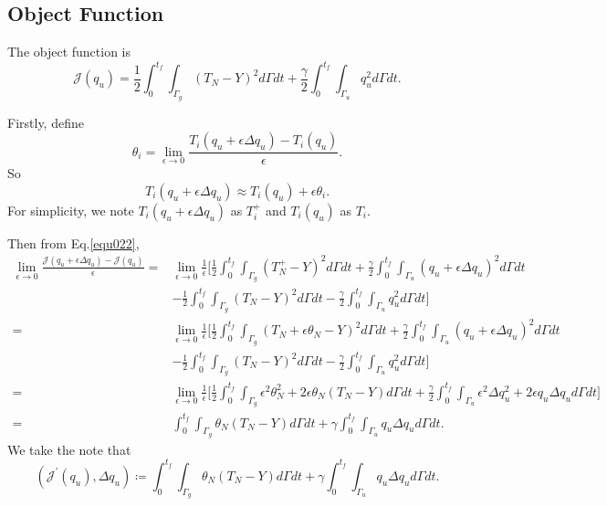 \documentclass[UTF-8]{article}
\begin{document}
\subsection{Object Function}
The object function is
\begin{equation}\label{equ022}
	\mathcal{J}(q_u) = \frac{1}{2} \int_{0}^{t_f} \int_{\Gamma_g} (T_N - Y)^2 d\Gamma dt + \frac{\gamma}{2} \int_0^{t_f} \int_{\Gamma_u} q_u^2 d\Gamma dt.
\end{equation}

Firstly, define
\begin{equation}
	\theta_i = \lim_{\epsilon \to 0} \frac{T_i(q_u + \epsilon \Delta q_u) - T_i(q_u)}{\epsilon}.
\end{equation}
So
\begin{equation}
	T_i(q_u + \epsilon \Delta q_u) \approx T_i(q_u) + \epsilon \theta_i.
\end{equation}
For simplicity, we note $T_i(q_u + \epsilon \Delta q_u)$ as $T_i^+$ and $T_i(q_u)$ as $T_i$.

Then from Eq.\ref{equ022},
\begin{align}
	\lim_{\epsilon \to 0} \frac{\mathcal{J}(q_u + \epsilon \Delta q_u) - \mathcal{J}(q_u)}{\epsilon} =& \lim_{\epsilon \to 0} \frac{1}{\epsilon} \Big[ \frac{1}{2} \int_{0}^{t_f} \int_{\Gamma_g} (T_N^+ - Y)^2 d\Gamma dt + \frac{\gamma}{2} \int_0^{t_f} \int_{\Gamma_u} (q_u + \epsilon \Delta q_u)^2 d\Gamma dt \nonumber \\
	&- \frac{1}{2} \int_{0}^{t_f} \int_{\Gamma_g} (T_N - Y)^2 d\Gamma dt - \frac{\gamma}{2} \int_0^{t_f} \int_{\Gamma_u} q_u^2 d\Gamma dt \Big] \nonumber \\
	=& \lim_{\epsilon \to 0} \frac{1}{\epsilon} \Big[ \frac{1}{2} \int_{0}^{t_f} \int_{\Gamma_g} (T_N + \epsilon \theta_N - Y)^2 d\Gamma dt + \frac{\gamma}{2} \int_0^{t_f} \int_{\Gamma_u} (q_u + \epsilon \Delta q_u)^2 d\Gamma dt \nonumber \\
	&- \frac{1}{2} \int_{0}^{t_f} \int_{\Gamma_g} (T_N - Y)^2 d\Gamma dt - \frac{\gamma}{2} \int_0^{t_f} \int_{\Gamma_u} q_u^2 d\Gamma dt \Big] \nonumber \\
	=& \lim_{\epsilon \to 0} \frac{1}{\epsilon} \Big[ \frac{1}{2} \int_{0}^{t_f} \int_{\Gamma_g} \epsilon^2 \theta_N^2 + 2\epsilon\theta_N(T_N - Y) d\Gamma dt + \frac{\gamma}{2} \int_0^{t_f} \int_{\Gamma_u} \epsilon^2 \Delta q_u^2 + 2\epsilon q_u \Delta q_u d\Gamma dt\Big] \nonumber \\
	=& \int_{0}^{t_f} \int_{\Gamma_g} \theta_N(T_N - Y) d\Gamma dt + \gamma \int_0^{t_f} \int_{\Gamma_u} q_u \Delta q_u d\Gamma dt.
\end{align}
We take the note that
\begin{equation}\label{equ023}
	(\mathcal{J}^\prime (q_u),\Delta q_u) \coloneqq \int_{0}^{t_f} \int_{\Gamma_g} \theta_N(T_N - Y) d\Gamma dt + \gamma \int_0^{t_f} \int_{\Gamma_u} q_u \Delta q_u d\Gamma dt.
\end{equation}
\end{document}
